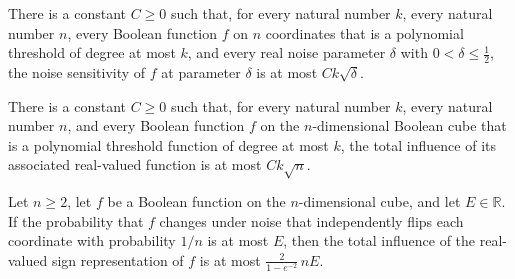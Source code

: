 \begin{definition}
\label{FABL.HasUniformPolynomialThresholdNoiseSensitivitySqrtBound}
\leanok
{}
There is a constant $C\geq0$ such that, for every natural number $k$, every natural
number $n$, every Boolean function $f$ on $n$ coordinates that is a polynomial threshold
of degree at most $k$, and every real noise parameter $\delta$ with
$0<\delta\leq\tfrac12$, the noise sensitivity of $f$ at parameter $\delta$ is at most
$Ck\sqrt{\delta}$.
\end{definition}

\begin{definition}
\label{FABL.HasUniformPolynomialThresholdTotalInfluenceSqrtBound}
\leanok
{}
There is a constant $C\ge 0$ such that, for every natural number $k$, every natural
number $n$, and every Boolean function $f$ on the $n$-dimensional Boolean cube that is a
polynomial threshold function of degree at most $k$, the total influence of its
associated real-valued function is at most $Ck\sqrt n$.
\end{definition}

\begin{theorem}
\label{FABL.totalInfluence_le_constant_mul_dimension_of_noiseSensitivity_inverseDimension_le}
\leanok
{}
Let $n\ge 2$, let $f$ be a Boolean function on the $n$-dimensional cube, and let
$E\in\mathbb R$. If the probability that $f$ changes under noise that independently
flips each coordinate with probability $1/n$ is at most $E$, then the total influence of
the real-valued sign representation of $f$ is at most $\displaystyle
\frac{2}{1-e^{-2}}\,nE$.
\end{theorem}

